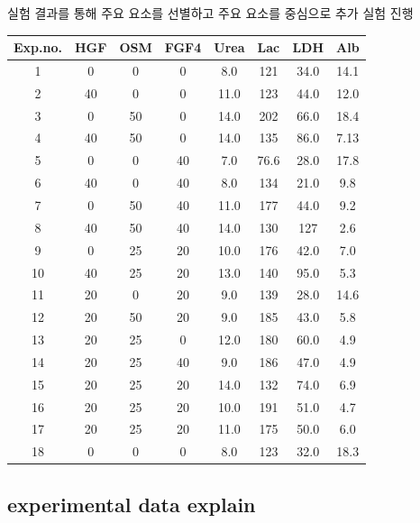 \documentclass{article}
\begin{document}
실험 결과를 통해 주요 요소를 선별하고 주요 요소를 중심으로 추가 실험 진행 
\begin{center}
    \begin{tabular}{||c | c c c c | c c c||} 
     \hline
     Exp.no.&HGF&OSM&FGF4&Urea&Lac&LDH&Alb\\
     \hline\hline
1&0&0&0&8.0&121&34.0&14.1\\
2&40&0&0&11.0&123&44.0&12.0\\
3&0&50&0&14.0&202&66.0&18.4\\
4&40&50&0&14.0&135&86.0&7.13\\
5&0&0&40&7.0&76.6&28.0&17.8\\
6&40&0&40&8.0&134&21.0&9.8\\
7&0&50&40&11.0&177&44.0&9.2\\
8&40&50&40&14.0&130&127&2.6\\
9&0&25&20&10.0&176&42.0&7.0\\
10&40&25&20&13.0&140&95.0&5.3\\
11&20&0&20&9.0&139&28.0&14.6\\
12&20&50&20&9.0&185&43.0&5.8\\
13&20&25&0&12.0&180&60.0&4.9\\
14&20&25&40&9.0&186&47.0&4.9\\
15&20&25&20&14.0&132&74.0&6.9\\
16&20&25&20&10.0&191&51.0&4.7\\
17&20&25&20&11.0&175&50.0&6.0\\
18&0&0&0&8.0&123&32.0&18.3\\
     \hline
    \end{tabular}
\end{center}
\subsection{experimental data explain}
\end{document}
